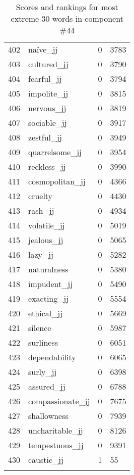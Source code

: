 \begin{longtable}[!htbp]{| rlr@{.}l |}
    402 & naïve\_jj & 0 & 3783 \\
    403 & cultured\_jj & 0 & 3790 \\
    404 & fearful\_jj & 0 & 3794 \\
    405 & impolite\_jj & 0 & 3815 \\
    406 & nervous\_jj & 0 & 3819 \\
    407 & sociable\_jj & 0 & 3917 \\
    408 & zestful\_jj & 0 & 3949 \\
    409 & quarrelsome\_jj & 0 & 3954 \\
    410 & reckless\_jj & 0 & 3990 \\
    411 & cosmopolitan\_jj & 0 & 4366 \\
    412 & cruelty & 0 & 4430 \\
    413 & rash\_jj & 0 & 4934 \\
    414 & volatile\_jj & 0 & 5019 \\
    415 & jealous\_jj & 0 & 5065 \\
    416 & lazy\_jj & 0 & 5282 \\
    417 & naturalness & 0 & 5380 \\
    418 & impudent\_jj & 0 & 5490 \\
    419 & exacting\_jj & 0 & 5554 \\
    420 & ethical\_jj & 0 & 5669 \\
    421 & silence & 0 & 5987 \\
    422 & surliness & 0 & 6051 \\
    423 & dependability & 0 & 6065 \\
    424 & surly\_jj & 0 & 6398 \\
    425 & assured\_jj & 0 & 6788 \\
    426 & compassionate\_jj & 0 & 7675 \\
    427 & shallowness & 0 & 7939 \\
    428 & uncharitable\_jj & 0 & 8126 \\
    429 & tempestuous\_jj & 0 & 9391 \\
    430 & caustic\_jj & 1 & 55 \\
    \hline
    \caption{Scores and rankings for most extreme 30 words in component \#44} \\
\end{longtable}
